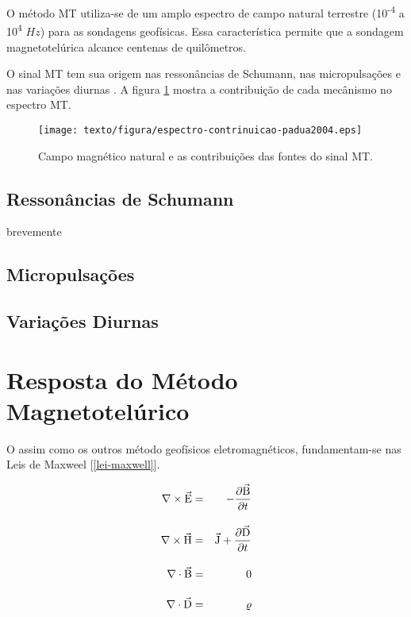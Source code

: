         O método MT utiliza-se de um amplo espectro de campo natural terrestre (10\textsuperscript{-4} a 10\textsuperscript{4} $Hz$) para as sondagens geofísicas. Essa característica permite que  a sondagem magnetotelúrica alcance centenas de quilômetros.
        
        O sinal MT tem sua origem nas ressonâncias de Schumann, nas micropulsações e nas variações diurnas \cite{padua2004estudos}. A figura \ref{sinalmt} mostra a contribuição de cada mecânismo no espectro MT.
        
        \begin{figure}[H]
            
            \caption{Campo magnético natural e as contribuições das fontes do sinal MT.}
            \begin{center}
             \texttt{[image: texto/figura/espectro-contrinuicao-padua2004.eps]}
            \end{center}
            \label{sinalmt}
        \end{figure}
        
        \subsection{Ressonâncias de Schumann}
        
            brevemente
        
        \subsection{Micropulsações}
        
        \subsection{Variações Diurnas}      
        
        
    \section{Resposta do Método Magnetotelúrico}

        O \mt{} assim como os outros método geofísicos eletromagnéticos, fundamentam-se nas Leis de Maxweel [\ref{lei-maxwell}].
        
        
        {\setlength\arraycolsep{2pt}
            \begin{eqnarray}
                \label{lei-maxwell}
                \nabla \times \vec{\textrm{E}} & = & - \dfrac{\partial \vec{\textrm{B}}}{\partial t} \nonumber\\[10pt]
                \nabla \times \vec{\textrm{H}} & = & \vec{\textrm{J}} + \dfrac{\partial \vec{\textrm{D}}}{\partial t} \nonumber\\[10pt]
                \nabla \cdot \vec{\textrm{B}} & = & 0 \nonumber\\[10pt]
                \nabla \cdot \vec{\textrm{D}} & = & \varrho                
            \end{eqnarray}}
        
